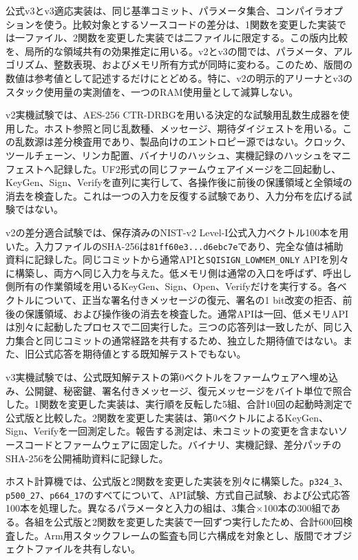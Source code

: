 \documentclass[a4paper,10pt]{ltjsarticle}
\theoremstyle{definition}
\theoremstyle{remark}
\begin{document}
公式v3とv3適応実装は、同じ基準コミット、パラメータ集合、コンパイラオプションを使う。比較対象とするソースコードの差分は、1関数を変更した実装では一ファイル、2関数を変更した実装では二ファイルに限定する。この版内比較を、局所的な領域共有の効果推定に用いる。v2とv3の間では、パラメータ、アルゴリズム、整数表現、およびメモリ所有方式が同時に変わる。このため、版間の数値は参考値として記述するだけにとどめる。特に、v2の明示的アリーナとv3のスタック使用量の実測値を、一つのRAM使用量として減算しない。

v2実機試験では、AES-256 CTR-DRBGを用いる決定的な試験用乱数生成器を使用した。ホスト参照と同じ乱数種、メッセージ、期待ダイジェストを用いる。この乱数源は差分検査用であり、製品向けのエントロピー源ではない。クロック、ツールチェーン、リンカ配置、バイナリのハッシュ、実機記録のハッシュをマニフェストへ記録した。UF2形式の同じファームウェアイメージを二回起動し、KeyGen、Sign、Verifyを直列に実行して、各操作後に前後の保護領域と全領域の消去を検査した。これは一つの入力を反復する試験であり、入力分布を広げる試験ではない。

v2の差分適合試験では、保存済みのNIST-v2 Level-I公式入力ベクトル100本を用いた。入力ファイルのSHA-256は\texttt{81ff60e3...d6ebc7e}であり、完全な値は補助資料に記録した。同じコミットから通常APIと\texttt{SQISIGN\_LOWMEM\_ONLY} APIを別々に構築し、両方へ同じ入力を与えた。低メモリ側は通常の入口を呼ばず、呼出し側所有の作業領域を用いるKeyGen、Sign、Open、Verifyだけを実行する。各ベクトルについて、正当な署名付きメッセージの復元、署名の1 bit改変の拒否、前後の保護領域、および操作後の消去を検査した。通常APIは一回、低メモリAPIは別々に起動したプロセスで二回実行した。三つの応答列は一致したが、同じ入力集合と同じコミットの通常経路を共有するため、独立した期待値ではない。また、旧公式応答を期待値とする既知解テストでもない。

v3実機試験では、公式既知解テストの第0ベクトルをファームウェアへ埋め込み、公開鍵、秘密鍵、署名付きメッセージ、復元メッセージをバイト単位で照合した。1関数を変更した実装は、実行順を反転した5組、合計10回の起動時測定で公式版と比較した。2関数を変更した実装は、第0ベクトルによるKeyGen、Sign、Verifyを一回測定した。報告する測定は、未コミットの変更を含まないソースコードとファームウェアに固定した。バイナリ、実機記録、差分パッチのSHA-256を公開補助資料に記録した。

ホスト計算機では、公式版と2関数を変更した実装を別々に構築した。\texttt{p324\_3}、\texttt{p500\_27}、\texttt{p664\_17}のすべてについて、API試験、方式自己試験、および公式応答100本を処理した。異なるパラメータと入力の組は、3集合\(\times\)100本の300組である。各組を公式版と2関数を変更した実装で一回ずつ実行したため、合計\num{600}回検査した。Arm用スタックフレームの監査も同じ六構成を対象とし、版間でオブジェクトファイルを共有しない。
\end{document}

